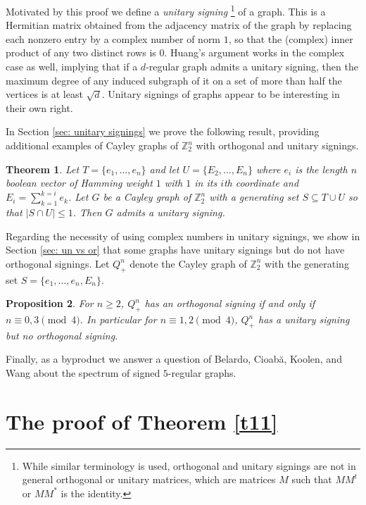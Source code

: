 \documentclass[11pt]{article}
\newtheorem{theo}{Theorem}[section]
\newtheorem{prop}[theo]{Proposition}
\begin{document}
Motivated by this proof we define a {\em unitary signing}
\footnote{While similar terminology is used, orthogonal and 
unitary signings are not in general orthogonal or unitary matrices, 
which are matrices $M$ such that $MM^t$ or $MM^*$ is the identity.}
of a graph. This is a Hermitian
matrix obtained from the adjacency 
matrix of the graph by replacing each nonzero entry
by a complex number of norm $1$, 
so that the (complex) inner product of any two distinct
rows is $0$.  Huang's argument works in the complex case
as well, implying that if a $d$-regular graph admits a unitary signing,
then the maximum degree of any induced subgraph of it on a set of more
than half the vertices is at least $\sqrt d$. 
Unitary signings of graphs appear to be interesting in their own right. 

In Section \ref{sec: unitary signings} we prove the following result, providing additional 
examples of Cayley graphs of $\mathbb{Z}_{2}^{n}$ with 
orthogonal and unitary signings.

\begin{theo}
\label{t21}
Let $T = \{e_1, \ldots, e_n \}$ and let $U = \{E_2, \ldots, E_n \}$
where $e_i$ is the length $n$ boolean vector of Hamming weight $1$
with $1$ in its
$i$th coordinate and $E_i = \sum_{k=1}^{k = i} e_k$.
Let $G$ be a Cayley graph of ${\mathbb{Z}_{2}^{n}}$ with a generating set $S \subseteq
T \cup U$ so that $|S \cap U| \leq 1$. Then $G$ admits 
a unitary signing.
\end{theo}

Regarding the necessity of using complex numbers in unitary signings, 
we show in Section \ref{sec: un vs or} that some graphs have unitary signings
but do not have orthogonal signings. Let $Q_{+}^n$ denote the Cayley graph
of ${\mathbb{Z}_{2}^{n}}$ with the generating set $S=\{e_1, \ldots ,e_n,E_n\}$. 
\begin{prop}
\label{Pr: No Real Signing}
For $n \geq 2$, $Q_{+}^{n}$ has an orthogonal signing if and only 
if $n \equiv 0,3 \pmod{4}$. In particular 
for $n \equiv 1, 2 \pmod{4}$, $Q_{+}^{n}$ has a unitary 
signing but no orthogonal signing.
\end{prop}

Finally, as a byproduct we answer a question of 
Belardo, Cioab\u{a}, Koolen, and Wang \cite{BCKW} 
about the spectrum of signed $5$-regular
graphs.

\section{The proof of Theorem \ref{t11}}
\vspace{0.2cm}
\end{document}
